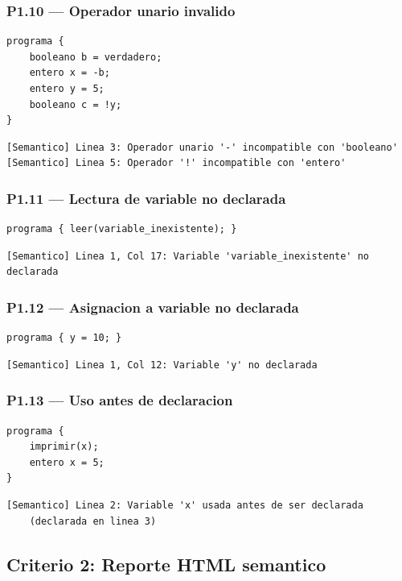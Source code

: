 \documentclass[11pt,a4paper]{article}
\begin{document}
\subsubsection{P1.10 --- Operador unario invalido}
\begin{lstlisting}[style=ml]
programa {
    booleano b = verdadero;
    entero x = -b;
    entero y = 5;
    booleano c = !y;
}
\end{lstlisting}
\begin{lstlisting}[style=err]
[Semantico] Linea 3: Operador unario '-' incompatible con 'booleano'
[Semantico] Linea 5: Operador '!' incompatible con 'entero'
\end{lstlisting}

\subsubsection{P1.11 --- Lectura de variable no declarada}
\begin{lstlisting}[style=ml]
programa { leer(variable_inexistente); }
\end{lstlisting}
\begin{lstlisting}[style=err]
[Semantico] Linea 1, Col 17: Variable 'variable_inexistente' no declarada
\end{lstlisting}

\subsubsection{P1.12 --- Asignacion a variable no declarada}
\begin{lstlisting}[style=ml]
programa { y = 10; }
\end{lstlisting}
\begin{lstlisting}[style=err]
[Semantico] Linea 1, Col 12: Variable 'y' no declarada
\end{lstlisting}

\subsubsection{P1.13 --- Uso antes de declaracion}
\begin{lstlisting}[style=ml]
programa {
    imprimir(x);
    entero x = 5;
}
\end{lstlisting}
\begin{lstlisting}[style=err]
[Semantico] Linea 2: Variable 'x' usada antes de ser declarada
    (declarada en linea 3)
\end{lstlisting}

\subsection{Criterio 2: Reporte HTML semantico}
\end{document}
